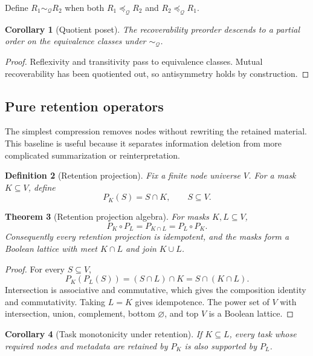 \documentclass[11pt,oneside]{article}
\theoremstyle{komorebiplain}
\newtheorem{theorem}{Theorem}[section]
\newtheorem{corollary}[theorem]{Corollary}
\theoremstyle{komorebidefinition}
\newtheorem{definition}[theorem]{Definition}
\theoremstyle{komorebiremark}
\newcommand{\Qcal}{\mathcal Q}
\begin{document}
Define $R_1\sim_{\Qcal}R_2$ when both $R_1\preceq_{\Qcal}R_2$ and $R_2\preceq_{\Qcal}R_1$.

\begin{corollary}[Quotient poset]
\label{res:7:6}
The recoverability preorder descends to a partial order on the equivalence classes under $\sim_{\Qcal}$.
\end{corollary}

\begin{proof}
Reflexivity and transitivity pass to equivalence classes. Mutual recoverability has been quotiented out, so antisymmetry holds by construction.
\end{proof}


\subsection{Pure retention operators}

The simplest compression removes nodes without rewriting the retained material. This baseline is useful because it separates information deletion from more complicated summarization or reinterpretation.

\begin{definition}[Retention projection]
\label{res:7:7}
Fix a finite node universe $V$. For a mask $K\subseteq V$, define
\[
P_K(S)=S\cap K,
\qquad S\subseteq V.
\]
\end{definition}

\begin{theorem}[Retention projection algebra]
\label{res:7:8}
For masks $K,L\subseteq V$,
\[
P_K\circ P_L=P_{K\cap L}=P_L\circ P_K.
\]
Consequently every retention projection is idempotent, and the masks form a Boolean lattice with meet $K\cap L$ and join $K\cup L$.
\end{theorem}

\begin{proof}
For every $S\subseteq V$,
\[
P_K(P_L(S))=(S\cap L)\cap K=S\cap(K\cap L).
\]
Intersection is associative and commutative, which gives the composition identity and commutativity. Taking $L=K$ gives idempotence. The power set of $V$ with intersection, union, complement, bottom $\varnothing$, and top $V$ is a Boolean lattice.
\end{proof}

\begin{corollary}[Task monotonicity under retention]
\label{res:7:9}
If $K\subseteq L$, every task whose required nodes and metadata are retained by $P_K$ is also supported by $P_L$.
\end{corollary}
\end{document}
